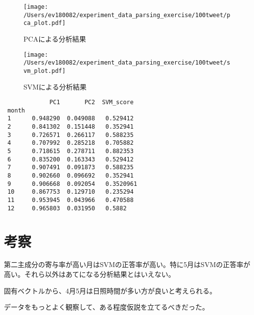 \documentclass[
]{article}
\begin{document}
\begin{figure}
\centering
\texttt{[image: /Users/ev180082/experiment\_data\_parsing\_exercise/100tweet/pca\_plot.pdf]}
\caption{PCAによる分析結果}
\end{figure}

\begin{figure}
\centering
\texttt{[image: /Users/ev180082/experiment\_data\_parsing\_exercise/100tweet/svm\_plot.pdf]}
\caption{SVMによる分析結果}
\end{figure}

\begin{verbatim}
             PC1       PC2  SVM_score
 month                               
 1      0.948290  0.049088   0.529412
 2      0.841302  0.151448   0.352941
 3      0.726571  0.266117   0.588235
 4      0.707992  0.285218   0.705882
 5      0.718615  0.278711   0.882353
 6      0.835200  0.163343   0.529412
 7      0.907491  0.091873   0.588235
 8      0.902660  0.096692   0.352941
 9      0.906668  0.092054   0.3520961
 10     0.867753  0.129710   0.235294
 11     0.953945  0.043966   0.470588
 12     0.965803  0.031950   0.5882
\end{verbatim}

\hypertarget{header-n2056}{%
\section{考察}\label{header-n2056}}

第二主成分の寄与率が高い月はSVMの正答率が高い。特に5月はSVMの正答率が高い。それら以外はあてになる分析結果とはいえない。

固有ベクトルから、4月5月は日照時間が多い方が良いと考えられる。

データをもっとよく観察して、ある程度仮説を立てるべきだった。
\end{document}
